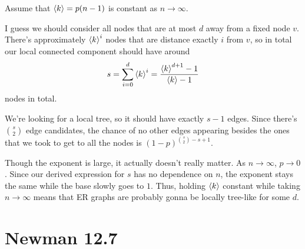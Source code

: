 \documentclass[12pt]{article}
\begin{document}
Assume that $\braket{k}=p(n-1)$ is constant as $n \to \infty$.

I guess we should consider all nodes that are at most $d$ away from a fixed node $v$.
There's approximately $\braket{k}^i$ nodes that are distance exactly $i$ from $v$,
so in total our local connected component should have around
\[s=\sum_{i=0}^{d} \braket{k}^i = \frac{\braket{k}^{d+1}-1}{\braket{k}-1}\]
nodes in total.

We're looking for a local tree, so it should have exactly $s-1$ edges.
Since there's $\binom{s}{2}$ edge candidates, the chance of no other
edges appearing besides the ones that we took to get to all the nodes is $(1-p)^{\binom{s}{2}-s+1}$.

Though the exponent is large, it actually doesn't really matter.
As $n \to \infty$, $p \to 0$.
Since our derived expression for $s$ has no dependence on $n$, the exponent
stays the same while the base slowly goes to $1$.
Thus, holding $\braket{k}$ constant while taking $n \to \infty$ means
that ER graphs are probably gonna be locally tree-like for some $d$.

\pagebreak

\section{Newman 12.7}
\end{document}
